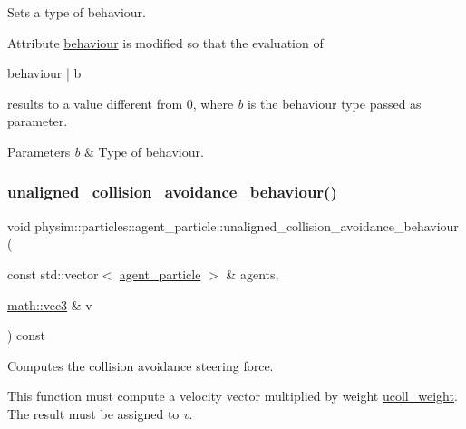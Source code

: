 Sets a type of behaviour. 

Attribute \hyperlink{classphysim_1_1particles_1_1agent__particle_af219e3f46630bb7f51f3d00952ed4f1c}{behaviour} is modified so that the evaluation of \begin{DoxyVerb}behaviour | b
\end{DoxyVerb}
 results to a value different from 0, where {\itshape b} is the behaviour type passed as parameter. 
\begin{DoxyParams}{Parameters}
{\em b} & Type of behaviour. \\
\hline
\end{DoxyParams}
\mbox{\label{classphysim_1_1particles_1_1agent__particle_a9322edc7431018233f64b56701af342b}} 
\subsubsection{\texorpdfstring{unaligned\+\_\+collision\+\_\+avoidance\+\_\+behaviour()}{unaligned\_collision\_avoidance\_behaviour()}}
{\footnotesize\ttfamily void physim\+::particles\+::agent\+\_\+particle\+::unaligned\+\_\+collision\+\_\+avoidance\+\_\+behaviour (\begin{DoxyParamCaption}\item[{const std\+::vector$<$ \hyperlink{classphysim_1_1particles_1_1agent__particle}{agent\+\_\+particle} $>$ \&}]{agents,  }\item[{\hyperlink{structphysim_1_1math_1_1vec3}{math\+::vec3} \&}]{v }\end{DoxyParamCaption}) const\hspace{0.3cm}{\ttfamily [virtual]}}



Computes the collision avoidance steering force. 

This function must compute a velocity vector multiplied by weight \hyperlink{classphysim_1_1particles_1_1agent__particle_ab25fc01e8a49f57aca2be031f048edea}{ucoll\+\_\+weight}. The result must be assigned to {\itshape v}.


